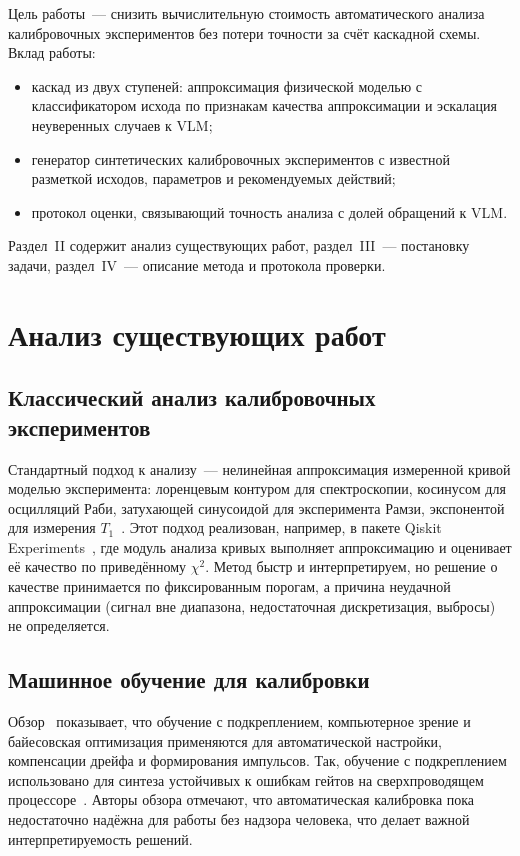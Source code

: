 \documentclass{misisarticle}
\begin{document}
Цель работы~--- снизить вычислительную стоимость автоматического анализа калибровочных экспериментов без потери точности за счёт каскадной схемы. Вклад работы:
\begin{itemize}
  \item каскад из двух ступеней: аппроксимация физической моделью с классификатором исхода по признакам качества аппроксимации и эскалация неуверенных случаев к VLM;
  \item генератор синтетических калибровочных экспериментов с известной разметкой исходов, параметров и рекомендуемых действий;
  \item протокол оценки, связывающий точность анализа с долей обращений к VLM.
\end{itemize}

Раздел~II содержит анализ существующих работ, раздел~III~--- постановку задачи, раздел~IV~--- описание метода и протокола проверки.

\section{Анализ существующих работ}

\subsection{Классический анализ калибровочных экспериментов}

Стандартный подход к анализу~--- нелинейная аппроксимация измеренной кривой моделью эксперимента: лоренцевым контуром для спектроскопии, косинусом для осцилляций Раби, затухающей синусоидой для эксперимента Рамзи, экспонентой для измерения $T_1$~\cite{krantz2019}. Этот подход реализован, например, в пакете Qiskit Experiments~\cite{kanazawa2023}, где модуль анализа кривых выполняет аппроксимацию и оценивает её качество по приведённому $\chi^2$. Метод быстр и интерпретируем, но решение о качестве принимается по фиксированным порогам, а причина неудачной аппроксимации (сигнал вне диапазона, недостаточная дискретизация, выбросы) не определяется.

\subsection{Машинное обучение для калибровки}

Обзор~\cite{alexeev2025} показывает, что обучение с подкреплением, компьютерное зрение и байесовская оптимизация применяются для автоматической настройки, компенсации дрейфа и формирования импульсов. Так, обучение с подкреплением использовано для синтеза устойчивых к ошибкам гейтов на сверхпроводящем процессоре~\cite{baum2021}. Авторы обзора отмечают, что автоматическая калибровка пока недостаточно надёжна для работы без надзора человека, что делает важной интерпретируемость решений.
\end{document}
